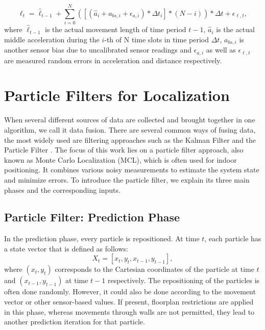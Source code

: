 \begin{equation}
\ell_{t} = \hat{\ell}_{t-1} + \sum_{i=0}^{N}([(\hat{a}_{i} + a_{bs,i} +\epsilon_{a, i}) * \Delta t_{i} ]*(N-i)) *\Delta t + \epsilon_{\ell, t},
\label{eqn:stride_length}
\end{equation}
where $\hat{\ell}_{t-1}$ is the actual movement length of time period $t-1$, $\hat{a}_{i}$ is the actual middle acceleration during the $i$-th of N time slots in time period $\Delta t$, $a_{bs,i}$ is another sensor bias due to uncalibrated sensor readings and $\epsilon_{a, i}$ as well as $\epsilon_{\ell, t}$ are measured random errors in acceleration and distance respectively.



\section{Particle Filters for Localization}
When several different sources of data are collected and brought together in one algorithm, we call it data fusion. There are several common ways of fusing data, the most widely used are filtering approaches such as the Kalman Filter \cite{Kurt} and the Particle Filter \cite{Carrera}. The focus of this work lies on a particle filter approach, also known as Monte Carlo Localization (MCL), which is often used for indoor positioning. It combines various noisy measurements to estimate the system state and minimize errors. To introduce the particle filter, we explain its three main phases and the corresponding inputs. 

\subsection{Particle Filter: Prediction Phase}
In the prediction phase, every particle is repositioned. At time $t$, each particle has a state vector that is defined as follows:
\begin{equation}
X_{t} = [x_{t}, y_{t}, x_{t-1}, y_{t-1}],
\label{eqn:particles}
\end{equation}
where $(x_{t}, y_{t})$ corresponds to the Cartesian coordinates of the particle at time $t$ and $(x_{t-1}, y_{t-1})$ at time $t-1$ respectively. The repositioning of the particles is often done randomly. However, it could also be done according to the movement vector or other sensor-based values. If present, floorplan restrictions are applied in this phase, whereas movements through walls are not permitted, they lead to another prediction iteration for that particle.

